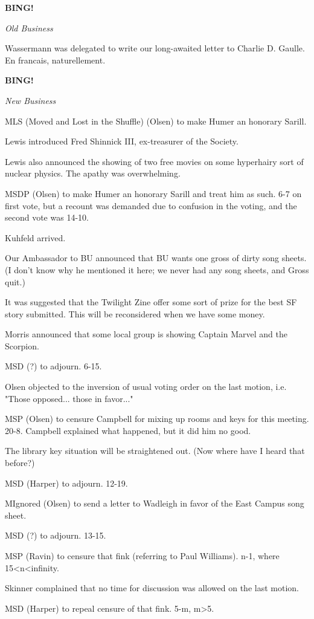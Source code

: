 \documentclass[12pt]{article}
\newcommand{\bing}{{\bf BING!} }
\newcommand{\goto}[1]{\bing \vskip 12pt \centerline{{\em{#1}}}}
\begin{document}
\goto{Old Business}

Wassermann was delegated to write our long-awaited letter to Charlie D. Gaulle. En francais, naturellement.

\goto{New Business}

MLS (Moved and Lost in the Shuffle) (Olsen) to make Humer an honorary Sarill.

Lewis introduced Fred Shinnick III, ex-treasurer of the Society.

Lewis also announced the showing of two free movies on some hyperhairy sort of nuclear physics. The apathy was overwhelming.

MSDP (Olsen) to make Humer an honorary Sarill and treat him as such. 6-7 on first vote, but a recount was demanded due to confusion in the voting, and the second vote was 14-10.

Kuhfeld arrived.

Our Ambassador to BU announced that BU wants one gross of dirty song sheets. (I don't know why he mentioned it here; we never had any song sheets, and Gross quit.)

It was suggested that the Twilight Zine offer some sort of prize for the best SF story submitted. This will be reconsidered when we have some money.

Morris announced that some local group is showing Captain Marvel and the Scorpion.

MSD (?) to adjourn. 6-15.

Olsen objected to the inversion of usual voting order on the last motion, i.e. "Those opposed... those in favor..."

MSP (Olsen) to censure Campbell for mixing up rooms and keys for this meeting. 20-8. Campbell explained what happened, but it did him no good.

The library key situation will be straightened out. (Now where have I heard that before?)

MSD (Harper) to adjourn. 12-19.

MIgnored (Olsen) to send a letter to Wadleigh in favor of the East Campus song sheet.

MSD (?) to adjourn. 13-15.

MSP (Ravin) to censure that fink (referring to Paul Williams). n-1, where 15<n<infinity.

Skinner complained that no time for discussion was allowed on the last motion.

MSD (Harper) to repeal censure of that fink. 5-m, m>5.
\end{document}
